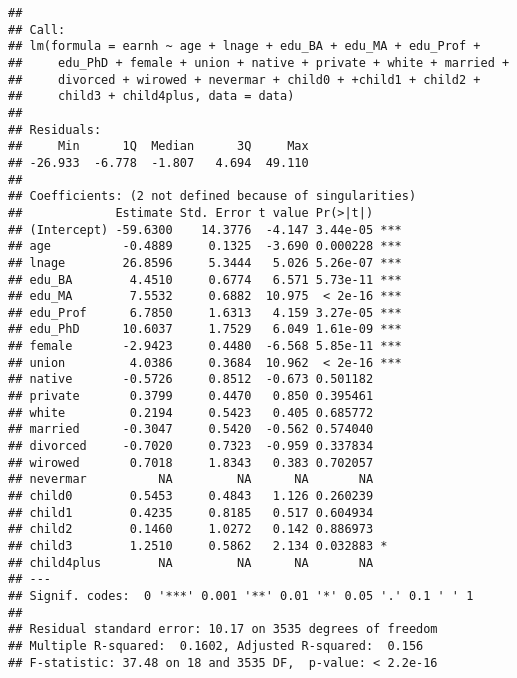 \documentclass[
]{article}
\newenvironment{Shaded}{\begin{snugshade}}{\end{snugshade}}
\newcommand{\FunctionTok}[1]{\textcolor[rgb]{0.00,0.00,0.00}{#1}}
\newcommand{\NormalTok}[1]{#1}
\newcommand{\OtherTok}[1]{\textcolor[rgb]{0.56,0.35,0.01}{#1}}
\newcommand{\SpecialCharTok}[1]{\textcolor[rgb]{0.00,0.00,0.00}{#1}}
\begin{document}
\begin{verbatim}
## 
## Call:
## lm(formula = earnh ~ age + lnage + edu_BA + edu_MA + edu_Prof + 
##     edu_PhD + female + union + native + private + white + married + 
##     divorced + wirowed + nevermar + child0 + +child1 + child2 + 
##     child3 + child4plus, data = data)
## 
## Residuals:
##     Min      1Q  Median      3Q     Max 
## -26.933  -6.778  -1.807   4.694  49.110 
## 
## Coefficients: (2 not defined because of singularities)
##             Estimate Std. Error t value Pr(>|t|)    
## (Intercept) -59.6300    14.3776  -4.147 3.44e-05 ***
## age          -0.4889     0.1325  -3.690 0.000228 ***
## lnage        26.8596     5.3444   5.026 5.26e-07 ***
## edu_BA        4.4510     0.6774   6.571 5.73e-11 ***
## edu_MA        7.5532     0.6882  10.975  < 2e-16 ***
## edu_Prof      6.7850     1.6313   4.159 3.27e-05 ***
## edu_PhD      10.6037     1.7529   6.049 1.61e-09 ***
## female       -2.9423     0.4480  -6.568 5.85e-11 ***
## union         4.0386     0.3684  10.962  < 2e-16 ***
## native       -0.5726     0.8512  -0.673 0.501182    
## private       0.3799     0.4470   0.850 0.395461    
## white         0.2194     0.5423   0.405 0.685772    
## married      -0.3047     0.5420  -0.562 0.574040    
## divorced     -0.7020     0.7323  -0.959 0.337834    
## wirowed       0.7018     1.8343   0.383 0.702057    
## nevermar          NA         NA      NA       NA    
## child0        0.5453     0.4843   1.126 0.260239    
## child1        0.4235     0.8185   0.517 0.604934    
## child2        0.1460     1.0272   0.142 0.886973    
## child3        1.2510     0.5862   2.134 0.032883 *  
## child4plus        NA         NA      NA       NA    
## ---
## Signif. codes:  0 '***' 0.001 '**' 0.01 '*' 0.05 '.' 0.1 ' ' 1
## 
## Residual standard error: 10.17 on 3535 degrees of freedom
## Multiple R-squared:  0.1602, Adjusted R-squared:  0.156 
## F-statistic: 37.48 on 18 and 3535 DF,  p-value: < 2.2e-16
\end{verbatim}

\begin{Shaded}
\end{Shaded}
\end{document}

